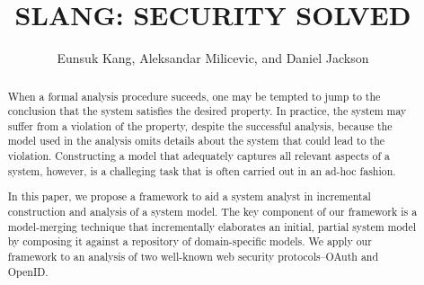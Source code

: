 \documentclass{llncs}
\begin{document}
\title{SLANG: SECURITY SOLVED}
%
%
\author{Eunsuk Kang, Aleksandar Milicevic, and Daniel Jackson}
%

\maketitle              %

\begin{abstract}
  When a formal analysis procedure suceeds, one may be tempted to jump to
  the conclusion that the system satisfies the desired property. In
  practice, the system may suffer from a violation of the property,
  despite the successful analysis, because the model used in the
  analysis omits details about the system that could lead to the
  violation. Constructing a model that adequately captures all
  relevant aspects of a system, however, is a challeging task that is
  often carried out in an ad-hoc fashion.

  In this paper, we propose a framework to aid a system analyst in
  incremental construction and analysis of a system model. The key
  component of our framework is a model-merging technique that
  incrementally elaborates an initial, partial system model by
  composing it against a repository of domain-specific models. We
  apply our framework to an analysis of two well-known web security
  protocols--OAuth and OpenID.
\end{abstract}










%
%
%

\end{document}

